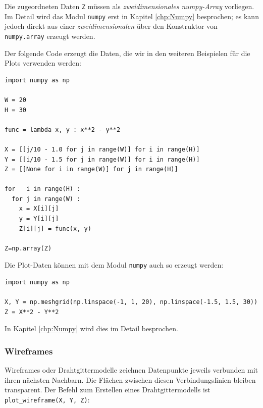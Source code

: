 Die zugeordneten Daten \texttt{Z} müssen als \emph{zweidimensionales numpy-Array} vorliegen. Im Detail wird das Modul \texttt{numpy} erst in Kapitel \ref{chp:Numpy} besprochen; es kann jedoch direkt aus einer \emph{zweidimensionalen}  über den Konstruktor von \texttt{numpy.array} erzeugt werden.

Der folgende Code erzeugt die Daten, die wir in den weiteren Beispielen für die Plots verwenden werden:
\begin{codebox}
\begin{verbatim}
import numpy as np

W = 20
H = 30

func = lambda x, y : x**2 - y**2

X = [[j/10 - 1.0 for j in range(W)] for i in range(H)]
Y = [[i/10 - 1.5 for j in range(W)] for i in range(H)]
Z = [[None for i in range(W)] for j in range(H)]

for   i in range(H) :
  for j in range(W) :
    x = X[i][j]
    y = Y[i][j]
    Z[i][j] = func(x, y)

Z=np.array(Z)
\end{verbatim}
\end{codebox}

\begin{tcolorbox}[title=Sneak Preview: numpy]
Die Plot-Daten können mit dem Modul \texttt{numpy} auch so erzeugt werden:

\vspace{6pt}
\begin{codebox}
\begin{verbatim}
import numpy as np

X, Y = np.meshgrid(np.linspace(-1, 1, 20), np.linspace(-1.5, 1.5, 30))
Z = X**2 - Y**2
\end{verbatim}
\end{codebox}

In Kapitel \ref{chp:Numpy} wird dies im Detail besprochen.
\end{tcolorbox}

\subsubsection{Wireframes}
Wireframes oder Drahtgittermodelle zeichnen Datenpunkte jeweils verbunden mit ihren nächsten Nachbarn. Die Flächen zwischen diesen Verbindungslinien bleiben transparent. Der Befehl zum Erstellen eines Drahtgittermodells ist \texttt{plot\_wireframe(X, Y, Z)}:

